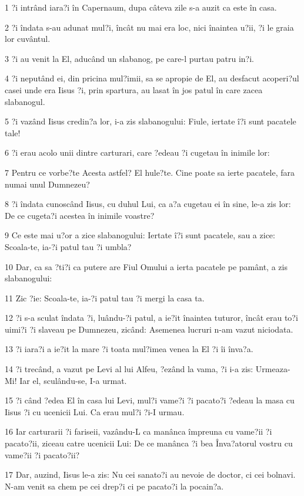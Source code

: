 \par 1 ?i intrând iara?i în Capernaum, dupa câteva zile s-a auzit ca este în casa.
\par 2 ?i îndata s-au adunat mul?i, încât nu mai era loc, nici înaintea u?ii, ?i le graia lor cuvântul.
\par 3 ?i au venit la El, aducând un slabanog, pe care-l purtau patru in?i.
\par 4 ?i neputând ei, din pricina mul?imii, sa se apropie de El, au desfacut acoperi?ul casei unde era Iisus ?i, prin spartura, au lasat în jos patul în care zacea slabanogul.
\par 5 ?i vazând Iisus credin?a lor, i-a zis slabanogului: Fiule, iertate î?i sunt pacatele tale!
\par 6 ?i erau acolo unii dintre carturari, care ?edeau ?i cugetau în inimile lor:
\par 7 Pentru ce vorbe?te Acesta astfel? El hule?te. Cine poate sa ierte pacatele, fara numai unul Dumnezeu?
\par 8 ?i îndata cunoscând Iisus, cu duhul Lui, ca a?a cugetau ei în sine, le-a zis lor: De ce cugeta?i acestea în inimile voastre?
\par 9 Ce este mai u?or a zice slabanogului: Iertate î?i sunt pacatele, sau a zice: Scoala-te, ia-?i patul tau ?i umbla?
\par 10 Dar, ca sa ?ti?i ca putere are Fiul Omului a ierta pacatele pe pamânt, a zis slabanogului:
\par 11 Zic ?ie: Scoala-te, ia-?i patul tau ?i mergi la casa ta.
\par 12 ?i s-a sculat îndata ?i, luându-?i patul, a ie?it înaintea tuturor, încât erau to?i uimi?i ?i slaveau pe Dumnezeu, zicând: Asemenea lucruri n-am vazut niciodata.
\par 13 ?i iara?i a ie?it la mare ?i toata mul?imea venea la El ?i îi înva?a.
\par 14 ?i trecând, a vazut pe Levi al lui Alfeu, ?ezând la vama, ?i i-a zis: Urmeaza-Mi! Iar el, sculându-se, I-a urmat.
\par 15 ?i când ?edea El în casa lui Levi, mul?i vame?i ?i pacato?i ?edeau la masa cu Iisus ?i cu ucenicii Lui. Ca erau mul?i ?i-I urmau.
\par 16 Iar carturarii ?i fariseii, vazându-L ca manânca împreuna cu vame?ii ?i pacato?ii, ziceau catre ucenicii Lui: De ce manânca ?i bea Înva?atorul vostru cu vame?ii ?i pacato?ii?
\par 17 Dar, auzind, Iisus le-a zis: Nu cei sanato?i au nevoie de doctor, ci cei bolnavi. N-am venit sa chem pe cei drep?i ci pe pacato?i la pocain?a.
